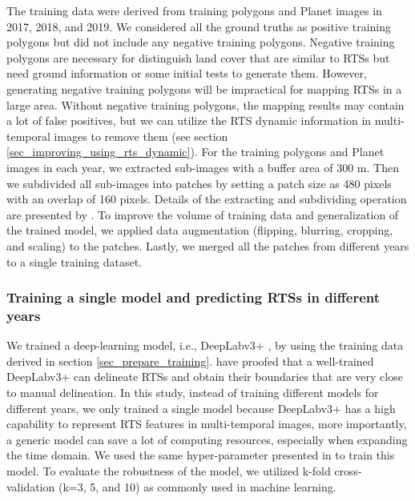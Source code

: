 \documentclass[authoryear,preprint,review,12pt]{elsarticle}
\begin{document}

The training data were derived from training polygons and Planet images in 2017, 2018, and 2019. 
We considered all the ground truths as positive training polygons but did not include any negative training polygons. 
Negative training polygons are necessary for distinguish land cover that are similar to RTSs but need ground information or some initial tests to generate them. 
However, generating negative training polygons will be impractical for mapping RTSs in a large area. 
Without negative training polygons, the mapping results may contain a lot of false positives, but we can utilize the RTS dynamic information in multi-temporal images to remove them (see section \ref{sec_improving_using_rts_dynamic}).
For the training polygons and Planet images in each year, we extracted sub-images with a buffer area of 300 m. 
Then we subdivided all sub-images into patches by setting a patch size as 480 pixels with an overlap of 160 pixels. 
Details of the extracting and subdividing operation are presented by \cite{huang2018automatic}.
To improve the volume of training data and generalization of the trained model, we applied data augmentation (flipping, blurring, cropping, and scaling) to the patches. 
Lastly, we merged all the patches from different years to a single training dataset. 


\subsubsection{Training a single model and predicting RTSs in different years}
\label{sec_train_prediction}

We trained a deep-learning model, i.e., DeepLabv3+ \citep{chen2018encoder-decoder}, by using the training data derived in section \ref{sec_prepare_training}. 
\cite{huang2020using} have proofed that a well-trained DeepLabv3+ can delineate RTSs and obtain their boundaries that are very close to manual delineation. 
In this study, instead of training different models for different years, we only trained a single model because DeepLabv3+ has a high capability to represent RTS features in multi-temporal images, more importantly, a generic model can save a lot of computing resources, especially when expanding the time domain.
We used the same hyper-parameter presented in \cite{huang2020using} to train this model. 
To evaluate the robustness of the model, we utilized k-fold cross-validation (k=3, 5, and 10)  as commonly used in machine learning. 
\end{document}
